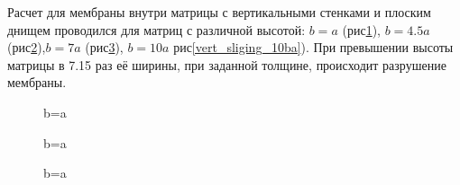 		Расчет для мембраны внутри матрицы с вертикальными стенками и плоским днищем проводился для матриц с различной высотой:
		$b = a$ (рис\ref{vert_sliging_ba}), $b = 4.5a$ (рис\ref{vert_sliging_4ba}),$b=7a$ (рис\ref{vert_sliging_7ba}), $b=10a$ рис\ref{vert_sliging_10ba}). При превышении высоты матрицы в 7.15 раз её ширины, при заданной толщине, происходит разрушение 
		мембраны.
		\begin{figure}[h!]	
				\def\svgwidth{\columnwidth}
				\caption{b=a} 
				\label{vert_sliging_ba}
		\end{figure}
		\begin{figure}[h!]	
				\def\svgwidth{\columnwidth}
				\caption{b=a} 
				\label{vert_sliging_4ba}
		\end{figure}
				\begin{figure}[h!]	
				\def\svgwidth{\columnwidth}
				\caption{b=a} 
				\label{vert_sliging_7ba}
		\end{figure}

